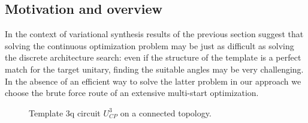 \documentclass[twocolumn, amsfonts, amssymb, aps, nofootinbib]{revtex4-2}
\begin{document}
\subsection{Motivation and overview}
In the context of variational synthesis results of the previous section suggest that solving the continuous optimization problem may be just as difficult as solving the discrete architecture search: even if the structure of the template is a perfect match for the target unitary, finding the suitable angles may be very challenging. In the absence of an efficient way to solve the latter problem in our approach we choose the brute force route of an extensive multi-start optimization.
\begin{figure*}
	\caption{ Template 3q circuit $U_{CP}^3$ on a connected topology.}
	\label{fig cp template}
\end{figure*}
\end{document}

